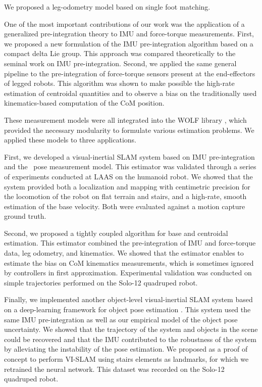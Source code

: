 We proposed a leg-odometry model based on single foot matching.

One of the most important contributions of our work was the application of a generalized pre-integration theory to IMU and force-torque measurements. 
%
First, we proposed a new formulation of the IMU pre-integration algorithm based on a compact delta Lie group. This approach was compared
theoretically to the seminal work on IMU pre-integration. 
%
Second, we applied the same general pipeline to the pre-integration of
force-torque sensors present at the end-effectors of legged robots. This algorithm was shown to make possible the high-rate estimation of centroidal 
quantities and to observe a bias on the traditionally used kinematics-based computation of the CoM position.   

\bigskip

These measurement models were all integrated into the WOLF library \cite{sola2021wolf}, which provided the necessary modularity to formulate various estimation
problems. We applied these models to three applications.

\bigskip

First, we developed a visual-inertial SLAM system based on IMU pre-integration and the \apriltag\ pose measurement model. This estimator was validated through
a series of experiments conducted at LAAS on the  humanoid robot. We showed that the system provided both a localization and mapping with centimetric precision
for the locomotion of the robot on flat terrain and stairs, and a high-rate, smooth estimation of the base velocity. Both were evaluated against a motion capture 
ground truth. 

Second, we proposed a tightly coupled algorithm for base and centroidal estimation. This estimator combined the pre-integration of IMU and force-torque data, 
leg odometry, and kinematics. We showed that the estimator enables to estimate the bias on CoM kinematics measurements, which is sometimes ignored
by controllers in first approximation. Experimental validation was conducted on simple trajectories performed on the Solo-12 quadruped robot. 

Finally, we implemented another object-level visual-inertial SLAM system based on a deep-learning framework for object pose estimation . This system  used the same 
IMU pre-integration as well as our empirical model of the object pose uncertainty. We showed that the trajectory of the system and objects
in the scene could be recovered and that the IMU contributed to the robustness of the system by alleviating the instability of the pose estimation. We proposed
as a proof of concept to perform VI-SLAM using stairs elements as landmarks, for which we retrained the neural network. This dataset was recorded on the Solo-12 quadruped robot.


